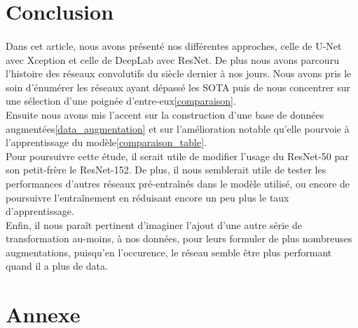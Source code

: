 \documentclass[
10pt, %
a4paper, %
oneside, %
headinclude,footinclude, %
]{scrartcl}
\begin{document}
\section{Conclusion}
\paragraph{}Dans cet article, nous avons présenté nos différentes approches, celle de U-Net avec Xception et celle de DeepLab avec ResNet. De plus nous avons parcouru l’histoire des réseaux convolutifs du siècle dernier à nos jours. Nous avons pris le soin d’énumérer les réseaux ayant dépassé les SOTA puis de nous concentrer sur une sélection d’une poignée d’entre-eux\ref{comparaison}.
\\
Ensuite nous avons mis l’accent sur la construction d’une base de données augmentées\ref{data_augmentation} et sur l’amélioration notable qu’elle pourvoie à l’apprentissage du modèle\ref{comparaison_table}.
\\
Pour poursuivre cette étude, il serait utile de modifier l’usage du ResNet-50 par son petit-frère le ResNet-152. De plus, il nous semblerait utile de tester les performances d’autres réseaux pré-entraînés dans le modèle utilisé, ou encore de poursuivre l’entraînement en réduisant encore un peu plus le taux d’apprentissage.
\\
Enfin, il nous paraît pertinent d’imaginer l’ajout d’une autre série de transformation au-moins, à nos données, pour leurs formuler de plus nombreuses augmentations, puisqu’en l’occurence, le réseau semble être plus performant quand il a plus de data.
\section{Annexe}
\end{document}
